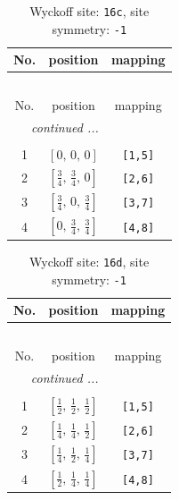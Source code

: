 \documentclass[fleqn,8pt]{jsarticle}
\begin{document}
\renewcommand{\arraystretch}{1.2}
\begin{longtable}{ccc}
\caption{Wyckoff site: {\tt 16c}, site symmetry: {\tt -1}}
 \\
 \hline \hline
No. & position & mapping \\ \hline \endfirsthead

\multicolumn{2}{l}{\tablename\ \thetable{}} \\
 \hline \hline
No. & position & mapping \\ \hline \endhead

 \hline \hline
\multicolumn{2}{r}{\footnotesize\it continued ...} \\ \endfoot

 \hline \hline
\multicolumn{2}{r}{} \\ \endlastfoot

1 & $\left[ 0,\, 0,\, 0 \right]$ & {\tt [1,5]} \\ \hline
2 & $\left[ \frac{3}{4},\, \frac{3}{4},\, 0 \right]$ & {\tt [2,6]} \\ \hline
3 & $\left[ \frac{3}{4},\, 0,\, \frac{3}{4} \right]$ & {\tt [3,7]} \\ \hline
4 & $\left[ 0,\, \frac{3}{4},\, \frac{3}{4} \right]$ & {\tt [4,8]} \\
\end{longtable}
\renewcommand{\arraystretch}{1.2}
\begin{longtable}{ccc}
\caption{Wyckoff site: {\tt 16d}, site symmetry: {\tt -1}}
 \\
 \hline \hline
No. & position & mapping \\ \hline \endfirsthead

\multicolumn{2}{l}{\tablename\ \thetable{}} \\
 \hline \hline
No. & position & mapping \\ \hline \endhead

 \hline \hline
\multicolumn{2}{r}{\footnotesize\it continued ...} \\ \endfoot

 \hline \hline
\multicolumn{2}{r}{} \\ \endlastfoot

1 & $\left[ \frac{1}{2},\, \frac{1}{2},\, \frac{1}{2} \right]$ & {\tt [1,5]} \\ \hline
2 & $\left[ \frac{1}{4},\, \frac{1}{4},\, \frac{1}{2} \right]$ & {\tt [2,6]} \\ \hline
3 & $\left[ \frac{1}{4},\, \frac{1}{2},\, \frac{1}{4} \right]$ & {\tt [3,7]} \\ \hline
4 & $\left[ \frac{1}{2},\, \frac{1}{4},\, \frac{1}{4} \right]$ & {\tt [4,8]} \\
\end{longtable}
\end{document}
